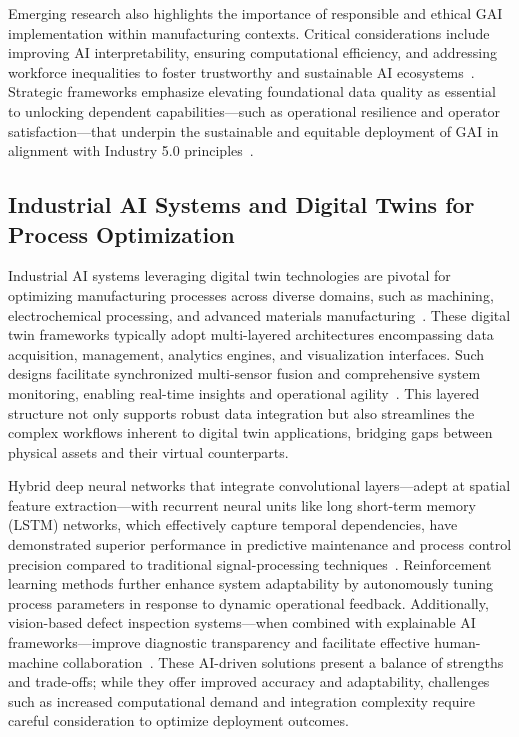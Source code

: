 \documentclass[sigconf]{acmart}
\begin{document}
Emerging research also highlights the importance of responsible and ethical GAI implementation within manufacturing contexts. Critical considerations include improving AI interpretability, ensuring computational efficiency, and addressing workforce inequalities to foster trustworthy and sustainable AI ecosystems~\cite{ref43}. Strategic frameworks emphasize elevating foundational data quality as essential to unlocking dependent capabilities—such as operational resilience and operator satisfaction—that underpin the sustainable and equitable deployment of GAI in alignment with Industry 5.0 principles~\cite{ref1}.

\subsection{Industrial AI Systems and Digital Twins for Process Optimization}

Industrial AI systems leveraging digital twin technologies are pivotal for optimizing manufacturing processes across diverse domains, such as machining, electrochemical processing, and advanced materials manufacturing~\cite{ref6,ref33}. These digital twin frameworks typically adopt multi-layered architectures encompassing data acquisition, management, analytics engines, and visualization interfaces. Such designs facilitate synchronized multi-sensor fusion and comprehensive system monitoring, enabling real-time insights and operational agility~\cite{ref35,ref45}. This layered structure not only supports robust data integration but also streamlines the complex workflows inherent to digital twin applications, bridging gaps between physical assets and their virtual counterparts.

Hybrid deep neural networks that integrate convolutional layers—adept at spatial feature extraction—with recurrent neural units like long short-term memory (LSTM) networks, which effectively capture temporal dependencies, have demonstrated superior performance in predictive maintenance and process control precision compared to traditional signal-processing techniques~\cite{ref4,ref15,ref38}. Reinforcement learning methods further enhance system adaptability by autonomously tuning process parameters in response to dynamic operational feedback. Additionally, vision-based defect inspection systems—when combined with explainable AI frameworks—improve diagnostic transparency and facilitate effective human-machine collaboration~\cite{ref39}. These AI-driven solutions present a balance of strengths and trade-offs; while they offer improved accuracy and adaptability, challenges such as increased computational demand and integration complexity require careful consideration to optimize deployment outcomes.
\end{document}
